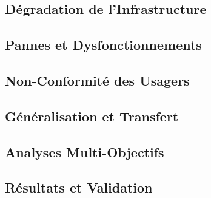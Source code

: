 \subsection{Dégradation de l'Infrastructure}
\label{subsec:degradation_infra}

\subsection{Pannes et Dysfonctionnements}
\label{subsec:pannes_dysfonctionnements}

\subsection{Non-Conformité des Usagers}
\label{subsec:non_conformite_usagers}

\subsection{Généralisation et Transfert}
\label{subsec:generalisation_transfert}

\subsection{Analyses Multi-Objectifs}
\label{subsec:analyses_multi_objectifs}

\subsection{Résultats et Validation}
\label{subsec:resultats_scenarios}

